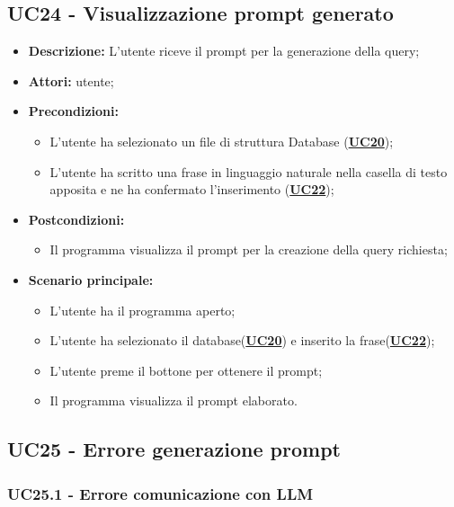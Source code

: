 \documentclass[5pt]{article}
\begin{document}
\subsection{UC24 - Visualizzazione prompt generato}
\label{sec:UC24}
\begin{itemize}
	\item \textbf{Descrizione:} L’utente riceve il prompt per la generazione della query;
	\item \textbf{Attori:} utente;
	\item \textbf{Precondizioni:} 
	\begin{itemize}
		\item L’utente ha selezionato un file di struttura Database (\hyperref[sec:UC20]{\textbf{UC20}});
		\item L’utente ha scritto una frase in linguaggio naturale nella casella di testo apposita e ne ha confermato l’inserimento (\hyperref[sec:UC22]{\textbf{UC22}});
	\end{itemize}
	\item \textbf{Postcondizioni:} 
	\begin{itemize}
		\item Il programma visualizza il prompt per la creazione della query richiesta;
	\end{itemize}
	\item \textbf{Scenario principale:} 
	\begin{itemize}
		\item L’utente ha il programma aperto;
		\item L’utente ha selezionato il database(\hyperref[sec:UC20]{\textbf{UC20}}) e inserito la frase(\hyperref[sec:UC22]{\textbf{UC22}});
		\item L’utente preme il bottone per ottenere il prompt;
		\item Il programma visualizza il prompt elaborato.
	\end{itemize}
\end{itemize}

\subsection{UC25 - Errore generazione prompt}
\label{sec:UC25}

\subsubsection{UC25.1 - Errore comunicazione con LLM}
\label{sec:UC25.1}
\end{document}
